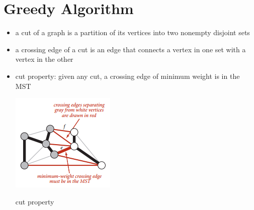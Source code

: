\documentclass[8pt,a4paper,compress]{beamer}
\begin{document}
\section{Greedy Algorithm}
\begin{frame}[fragile]
\begin{itemize}
\item a cut of a graph is a partition of its vertices into two nonempty disjoint sets

\item a crossing edge of a cut is an edge that connects a vertex in one set with a vertex in the other

\item cut property: given any cut, a crossing edge of minimum weight is in the MST

\begin{center}
\includegraphics[scale=0.4]{./figures/mst2.png}

\smallskip

\tiny cut property
\end{center}
\end{itemize}
\end{frame}
\end{document}
